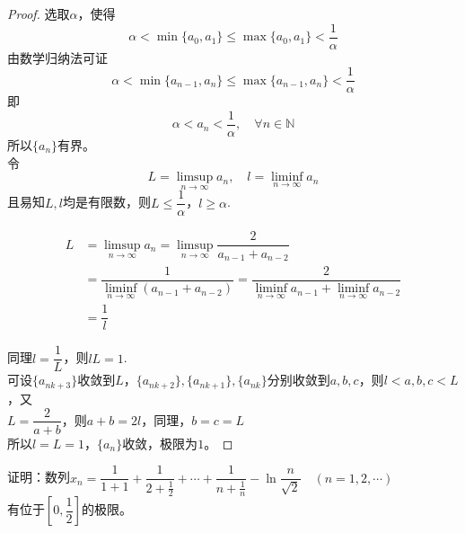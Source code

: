 \begin{proof}

    选取$\alpha$，使得
    $$\alpha < \min\{a_0,a_1\} \leq \max\{a_0,a_1\} < \dfrac{1}{\alpha}$$
    由数学归纳法可证
    $$\alpha < \min\{a_{n - 1},a_n\} \leq \max\{a_{n - 1},a_n\} < \dfrac{1}{\alpha}$$
    即
    $$\alpha < a_n < \dfrac{1}{\alpha}, \quad \forall n \in \mathbb{N}$$
    所以$\{a_n\}$有界。\\
    令
    $$L = \limsup_{n \to \infty}{a_n},\quad l = \liminf_{n \to \infty}{a_n}$$
    且易知$L,l$均是有限数，则$L \leq \dfrac{1}{\alpha}$，$l \geq \alpha$.

    \begin{align*}
        L & = \limsup_{n \to \infty}{a_n} = \limsup_{n \to \infty}{\dfrac{2}{a_{n - 1} + a_{n - 2}}} \\
         & = \dfrac{1}{\liminf\limits_{n \to \infty}{(a_{n - 1} + a_{n - 2})}} = \dfrac{2}{\liminf\limits_{n \to \infty}{a_{n - 1}} + \liminf\limits_{n \to \infty}{a_{n - 2}}} \\ 
         & = \dfrac{1}{l}
    \end{align*}

    同理$l = \dfrac{1}{L}$，则$lL = 1$. \\
    可设$\{a_{nk + 3}\}$收敛到$L$，$\{a_{nk + 2}\},\{a_{nk + 1}\},\{a_{nk}\}$分别收敛到$a,b,c$，则$l < a,b,c < L$，又\\
    $L = \dfrac{2}{a + b} $，则$a + b = 2l $，同理，$b = c = L$\\
    所以$l = L = 1$，$\{a_n\}$收敛，极限为$1$。

\end{proof}

\begin{proposition}

    证明：数列$x_n = \dfrac{1}{1 + 1} + \dfrac{1}{2 + \frac{1}{2}} + \cdots + \dfrac{1}{n + \frac{1}{n}} - \ln{\dfrac{n}{\sqrt{2}}} \quad (n = 1, 2, \cdots)$\\
    有位于$\left[ 0,\dfrac{1}{2} \right]$的极限。
    
\end{proposition}

